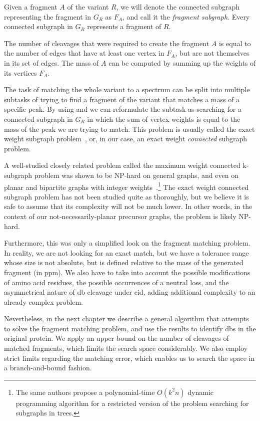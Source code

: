 \begin{defn}\label{defn:fragment}
  Given a fragment \(A\) of the variant \(R\), we will denote the connected subgraph representing the fragment in \(G_R\) as \(F_A\), and call it the \emph{fragment subgraph}. Every connected subgraph in \(G_R\) represents a fragment of \(R\).
\end{defn}

\begin{lemma}\label{lemma:mass}
  The number of cleavages that were required to create the fragment \(A\) is equal to the number of edges that have at least one vertex in \(F_A\), but are not themselves in its set of edges. The mass of \(A\) can be computed by summing up the weights of its vertices \(F_A\).
\end{lemma}

The task of matching the whole variant to a spectrum can be split into multiple subtasks of trying to find a fragment of the variant that matches a mass of a specific peak. By using  and  we can reformulate the subtask as searching for a connected subgraph in \(G_R\) in which the sum of vertex weights is equal to the mass of the peak we are trying to match. This problem is usually called the exact weight subgraph problem~\cite{abboud2013exact}, or, in our case, an exact weight \emph{connected} subgraph problem.

A well-studied closely related problem called the maximum weight connected k-subgraph problem was shown to be NP-hard on general graphs, and even on planar and bipartite graphs with integer weights~\cite{hochbaum1994node}.\footnote{The same authors propose a polynomial-time \(O(k^2n)\) dynamic programming algorithm for a restricted version of the problem searching for subgraphs in trees.} The exact weight connected subgraph problem has not been studied quite as thoroughly, but we believe it is safe to assume that its complexity will not be much lower. In other words, in the context of our not-necessarily-planar precursor graphs, the problem is likely NP-hard.

Furthermore, this was only a simplified look on the fragment matching problem. In reality, we are not looking for an exact match, but we have a tolerance range whose size is not absolute, but is defined relative to the mass of the generated fragment (in ppm). We also have to take into account the possible modifications of amino acid residues, the possible occurrences of a neutral loss, and the asymmetrical nature of \gls*{db} cleavage under \gls*{cid}, adding additional complexity to an already complex problem.

Nevertheless, in the next chapter we describe a general algorithm that attempts to solve the fragment matching problem, and use the results to identify \glspl*{db} in the original protein. We apply an upper bound on the number of cleavages of matched fragments, which limits the search space considerably. We also employ strict limits regarding the matching error, which enables us to search the space in a branch-and-bound fashion.